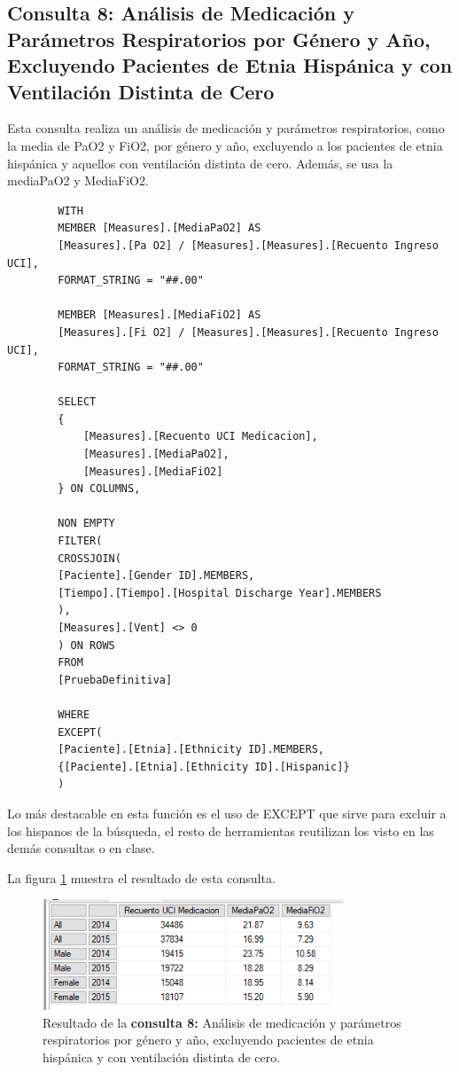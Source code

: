\documentclass[12pt, a4paper, twoside]{article}
\begin{document}
	\subsection{Consulta 8: Análisis de Medicación y Parámetros Respiratorios por Género y Año, Excluyendo Pacientes de Etnia Hispánica y con Ventilación Distinta de Cero}
	
	Esta consulta realiza un análisis de medicación y parámetros respiratorios, como la media de PaO2 y FiO2, por género y año, excluyendo a los pacientes de etnia hispánica y aquellos con ventilación distinta de cero. Además, se usa la mediaPaO2 y MediaFiO2.
	
	\begin{verbatim}
		WITH 
		MEMBER [Measures].[MediaPaO2] AS
		[Measures].[Pa O2] / [Measures].[Measures].[Recuento Ingreso UCI],
		FORMAT_STRING = "##.00"
		
		MEMBER [Measures].[MediaFiO2] AS
		[Measures].[Fi O2] / [Measures].[Measures].[Recuento Ingreso UCI],
		FORMAT_STRING = "##.00"
		
		SELECT 
		{ 
			[Measures].[Recuento UCI Medicacion],
			[Measures].[MediaPaO2],
			[Measures].[MediaFiO2]
		} ON COLUMNS,
		
		NON EMPTY 
		FILTER(
		CROSSJOIN(
		[Paciente].[Gender ID].MEMBERS,
		[Tiempo].[Tiempo].[Hospital Discharge Year].MEMBERS 
		),
		[Measures].[Vent] <> 0
		) ON ROWS
		FROM 
		[PruebaDefinitiva]
		
		WHERE 
		EXCEPT(
		[Paciente].[Etnia].[Ethnicity ID].MEMBERS,
		{[Paciente].[Etnia].[Ethnicity ID].[Hispanic]}
		)
	\end{verbatim}
	
	Lo más destacable en esta función es el uso de EXCEPT que sirve para excluir a los hispanos de la búsqueda, el resto de herramientas reutilizan los visto en las demás consultas o en clase.
	
	La figura \ref{fig:consulta8} muestra el resultado de esta consulta.
	
	\begin{figure}[H]
		\centering
		\includegraphics[width=0.8\textwidth]{image/consulta8.png}
		\caption{Resultado de la \textbf{consulta 8:} Análisis de medicación y parámetros respiratorios por género y año, excluyendo pacientes de etnia hispánica y con ventilación distinta de cero.}
		\label{fig:consulta8}
	\end{figure}
	
\end{document}
